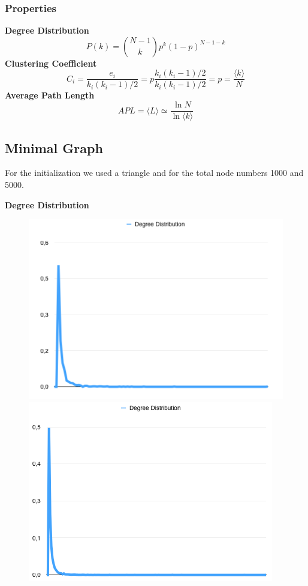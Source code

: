 \documentclass[a4paper,titlepage,11pt]{article}
\begin{document}
\subsubsection{Properties}
\textbf{Degree Distribution}
\[
  P(k) = {{N-1}\choose{k}} p^{k}(1-p)^{N-1-k}
\]
\textbf{Clustering Coefficient}
\[
  C_i = \frac{e_i}{k_i(k_i-1)/2} = p \frac{k_i(k_i-1)/2}{k_i(k_i-1)/2} = p = \frac{\langle k\rangle}{N}
\]
\textbf{Average Path Length}
\[
  APL = \langle L\rangle \simeq \frac{\ln{N}}{\ln{\langle k\rangle}}
\]

\subsection{Minimal Graph}
For the initialization we used a triangle and for the total node numbers 1000 and 5000.

\textbf{Degree Distribution}

\begin{figure}[h]
    \centering
    \includegraphics[scale=0.50]{img/dd-minimal-3-1000.png}
    \includegraphics[scale=0.50]{img/dd-minimal-3-5000.png}
\end{figure}
\end{document}
